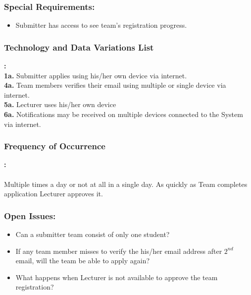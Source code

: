 \subsubsection*{Special Requirements:}
    \begin{itemize}
    \itemsep-1em 
       \item Submitter has access to see team’s registration progress.
    \end{itemize}
     

     \subsubsection*{Technology and Data Variations List}\textbf{:}
     \\
     \textbf{1a.} Submitter applies using his/her own device via internet.
     \\
     \textbf{4a.} Team members verifies their email using multiple or single device via internet.
     \\
    \textbf{ 5a.} Lecturer uses his/her own device
     \\
     \textbf{6a.} Notifications may be received on multiple devices connected to the System via internet.
     
     \subsubsection*{Frequency of Occurrence}\textbf{:}
     \\
     \\
     Multiple  times  a  day  or  not  at  all  in  a  single  day.  As  quickly  as Team  completes  application Lecturer approves it.
     
     
     
     \subsubsection*{Open Issues:}
    \begin{itemize}
    \itemsep-1em 
       \item Can a submitter team consist of only one student? 
       \item If any team member misses to verify the his/her email address after $2^{nd}$ email, will the team be able to apply again?
       \item What happens when Lecturer is not available to approve the team registration?
    \end{itemize}
    
